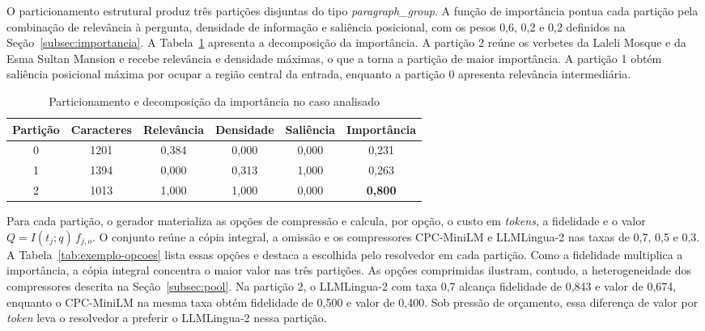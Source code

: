 O particionamento estrutural produz três partições disjuntas do tipo \textit{paragraph\_group}. A função de importância pontua cada partição pela combinação de relevância à pergunta, densidade de informação e saliência posicional, com os pesos 0,6, 0,2 e 0,2 definidos na Seção~\ref{subsec:importancia}. A Tabela~\ref{tab:exemplo-particoes} apresenta a decomposição da importância. A partição 2 reúne os verbetes da Laleli Mosque e da Esma Sultan Mansion e recebe relevância e densidade máximas, o que a torna a partição de maior importância. A partição 1 obtém saliência posicional máxima por ocupar a região central da entrada, enquanto a partição 0 apresenta relevância intermediária.

\begin{table}[htbp]
\centering
\caption{Particionamento e decomposição da importância no caso analisado}
\label{tab:exemplo-particoes}
\begin{tabular}{cccccc}
\toprule
\textbf{Partição} & \textbf{Caracteres} & \textbf{Relevância} & \textbf{Densidade} & \textbf{Saliência} & \textbf{Importância} \\
\midrule
0 & 1201 & 0,384 & 0,000 & 0,000 & 0,231 \\
1 & 1394 & 0,000 & 0,313 & 1,000 & 0,263 \\
2 & 1013 & 1,000 & 1,000 & 0,000 & \textbf{0,800} \\
\bottomrule
\end{tabular}
\end{table}

Para cada partição, o gerador materializa as opções de compressão e calcula, por opção, o custo em \textit{tokens}, a fidelidade e o valor $Q = I(t_j;q)\,f_{j,o}$. O conjunto reúne a cópia integral, a omissão e os compressores CPC-MiniLM e LLMLingua-2 nas taxas de 0,7, 0,5 e 0,3. A Tabela~\ref{tab:exemplo-opcoes} lista essas opções e destaca a escolhida pelo resolvedor em cada partição. Como a fidelidade multiplica a importância, a cópia integral concentra o maior valor nas três partições. As opções comprimidas ilustram, contudo, a heterogeneidade dos compressores descrita na Seção~\ref{subsec:pool}. Na partição 2, o LLMLingua-2 com taxa 0,7 alcança fidelidade de 0,843 e valor de 0,674, enquanto o CPC-MiniLM na mesma taxa obtém fidelidade de 0,500 e valor de 0,400. Sob pressão de orçamento, essa diferença de valor por \textit{token} leva o resolvedor a preferir o LLMLingua-2 nessa partição.

